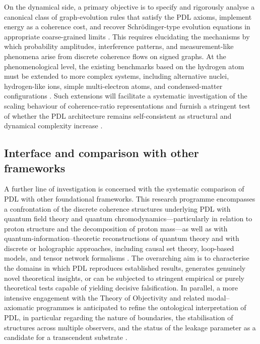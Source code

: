 \documentclass{article}
\begin{document}
On the dynamical side, a primary objective is to specify and rigorously analyse a canonical class of graph-evolution rules that satisfy the PDL axioms, implement energy as a coherence cost, and recover Schr\"odinger-type evolution equations in appropriate coarse-grained limits \citep{Coherence_Leakage_18_2026,Coherence_Leakage_18_2026}. This requires elucidating the mechanisms by which probability amplitudes, interference patterns, and measurement-like phenomena arise from discrete coherence flows on signed graphs. At the phenomenological level, the existing benchmarks based on the hydrogen atom must be extended to more complex systems, including alternative nuclei, hydrogen-like ions, simple multi-electron atoms, and condensed-matter configurations \citep{PDL_Main_2026,Schrodinger_Sketch_v2_2026}. Such extensions will facilitate a systematic investigation of the scaling behaviour of coherence-ratio representations and furnish a stringent test of whether the PDL architecture remains self-consistent as structural and dynamical complexity increase \cite{PDL_position}.

\subsection{Interface and comparison with other frameworks}
\label{subsec:roadmap_interface}

A further line of investigation is concerned with the systematic comparison of PDL with other foundational frameworks. This research programme encompasses a confrontation of the discrete coherence structures underlying PDL with quantum field theory and quantum chromodynamics—particularly in relation to proton structure and the decomposition of proton mass—as well as with quantum-information–theoretic reconstructions of quantum theory and with discrete or holographic approaches, including causal set theory, loop-based models, and tensor network formalisms \citep{PDL_intro,PDL_position}. The overarching aim is to characterise the domains in which PDL reproduces established results, generates genuinely novel theoretical insights, or can be subjected to stringent empirical or purely theoretical tests capable of yielding decisive falsification. In parallel, a more intensive engagement with the Theory of Objectivity and related modal–axiomatic programmes is anticipated to refine the ontological interpretation of PDL, in particular regarding the nature of boundaries, the stabilisation of structures across multiple observers, and the status of the leakage parameter as a candidate for a transcendent substrate \citep{PDL_TO_dialogue,PDL_position}.
\end{document}
